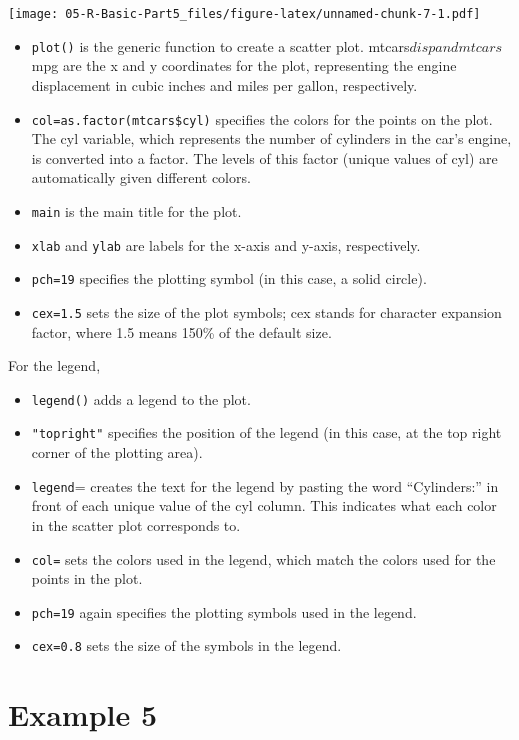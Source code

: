 \documentclass[
]{book}
\providecommand{\tightlist}{%
  \setlength{\itemsep}{0pt}\setlength{\parskip}{0pt}}
\begin{document}
\texttt{[image: 05-R-Basic-Part5\_files/figure-latex/unnamed-chunk-7-1.pdf]}

\begin{itemize}
\tightlist
\item
  \texttt{plot()} is the generic function to create a scatter plot.
  mtcars\(disp and mtcars\)mpg are the x and y coordinates for the plot, representing the engine displacement in cubic inches and miles per gallon, respectively.
\item
  \texttt{col=as.factor(mtcars\$cyl)} specifies the colors for the points on the plot. The cyl variable, which represents the number of cylinders in the car's engine, is converted into a factor. The levels of this factor (unique values of cyl) are automatically given different colors.
\item
  \texttt{main} is the main title for the plot.
\item
  \texttt{xlab} and \texttt{ylab} are labels for the x-axis and y-axis, respectively.
\item
  \texttt{pch=19} specifies the plotting symbol (in this case, a solid circle).
\item
  \texttt{cex=1.5} sets the size of the plot symbols; cex stands for character expansion factor, where 1.5 means 150\% of the default size.
\end{itemize}

For the legend,

\begin{itemize}
\tightlist
\item
  \texttt{legend()} adds a legend to the plot.
\item
  \texttt{"topright"} specifies the position of the legend (in this case, at the top right corner of the plotting area).
\item
  \texttt{legend}= creates the text for the legend by pasting the word ``Cylinders:'' in front of each unique value of the cyl column. This indicates what each color in the scatter plot corresponds to.
\item
  \texttt{col=} sets the colors used in the legend, which match the colors used for the points in the plot.
\item
  \texttt{pch=19} again specifies the plotting symbols used in the legend.
\item
  \texttt{cex=0.8} sets the size of the symbols in the legend.
\end{itemize}

\section*{Example 5}\label{example-5}
\end{document}
